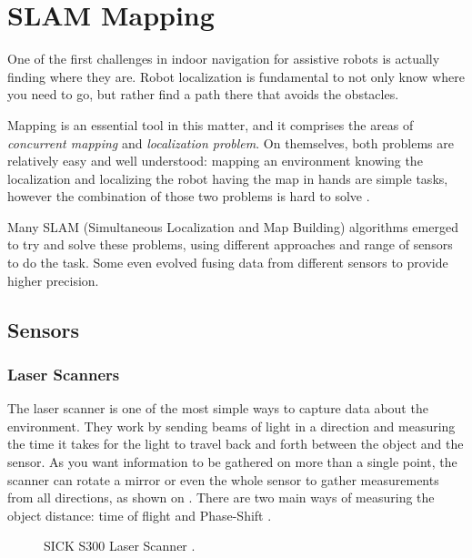 \chapter{SLAM Mapping}\label{chp:slam_mapping}

One of the first challenges in indoor navigation for assistive robots is actually finding where they are. Robot localization is fundamental to not only know where you need to go, but rather find a path there that avoids the obstacles.

Mapping is an essential tool in this matter, and it comprises the areas of \textit{concurrent mapping} and \textit{localization problem}. On themselves, both problems are relatively easy and well understood: mapping an environment knowing the localization and localizing the robot having the map in hands are simple tasks, however the combination of those two problems is hard to solve \cite{thrun2000real}.

Many SLAM (Simultaneous Localization and
Map Building) algorithms emerged to try and solve these problems, using different approaches and range of sensors to do the task. Some even evolved fusing data from different sensors to provide higher precision.

\section{Sensors}

\subsection{Laser Scanners}

The laser scanner is one of the most simple ways to capture data about the environment. They work by sending beams of light in a direction and measuring the time it takes for the light to travel back and forth between the object and the sensor. As you want information to be gathered on more than a single point, the scanner can rotate a mirror or even the whole sensor to gather measurements from all directions, as shown on . There are two main ways of measuring the object distance: time of flight and Phase-Shift \cite{amann2001laser}.

\begin{figure}
     \centering
     \caption{SICK S300 Laser Scanner \cite{sicks300}.}
     \label{fig:sick_s300}
\end{figure}

